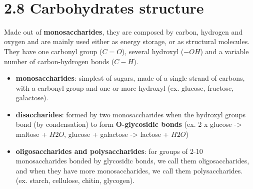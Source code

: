 \documentclass[a4paper,landscape,10pt]{cheatsheet}
\begin{document}
\hfil\\
\section*{2.8 Carbohydrates structure}
Made out of \textbf{monosaccharides}, they are composed by carbon, hydrogen and oxygen and are mainly used either as
energy storage, or as structural molecules.\\
They have one carbonyl group ($C=O$), several hydroxyl ($-OH$) and a variable number of carbon-hydrogen bonds ($C-H$).\\
\begin{itemize}
  \item \textbf{monosaccharides}: simplest of sugars, made of a single strand of carbons, with a carbonyl group and one
        or more hydroxyl (ex. glucose, fructose, galactose).
  \item \textbf{disaccharides}: formed by two monosaccharides when the hydroxyl groups bond (by condensation) to form
        \textbf{O-glycosidic bonds} (ex. 2 x glucose -> maltose + $H2O$, glucose + galactose -> lactose + $H2O$)
  \item \textbf{oligosaccharides and polysaccharides}: for groups of 2-10 monosaccharides bonded by glycosidic bonds, we
        call them oligosaccharides, and when they have more monosaccharides, we call them polysaccharides. (ex. starch,
        cellulose, chitin, glycogen).
\end{itemize}
\end{document}
